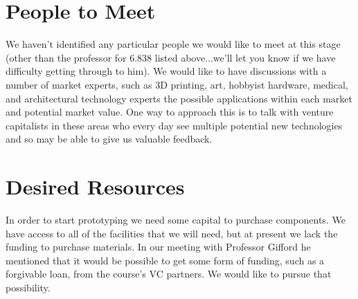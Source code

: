 \documentclass[10pt]{article}
\begin{document}
\section{People to Meet} We haven't identified any particular people we would
like to meet at this stage (other than the professor for 6.838 listed
above...we'll let you know if we have difficulty getting through to him). We
would like to have discussions with a number of market experts, such as 3D
printing, art, hobbyist hardware, medical, and architectural technology experts
the possible applications within each market and potential market value. One way
to approach this is to talk with venture capitalists in these areas who every
day see multiple potential new technologies and so may be able to give us
valuable feedback.

\section{Desired Resources} In order to start prototyping we need some capital
to purchase components. We have access to all of the facilities that we will
need, but at present we lack the funding to purchase materials. In our meeting
with Professor Gifford he mentioned that it would be possible to get some form
of funding, such as a forgivable loan, from the course's VC partners. We would
like to pursue that possibility.
\end{document}
